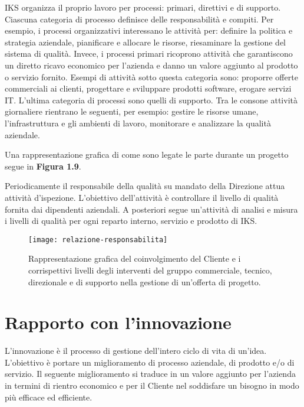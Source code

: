 IKS organizza il proprio lavoro per processi: primari, direttivi e di supporto. 
Ciascuna categoria di processo definisce delle responsabilità e compiti. 
Per esempio, i processi organizzativi interessano le attività per: definire la politica 
e strategia aziendale, pianificare e allocare le risorse, riesaminare la gestione del 
sistema di qualità. Invece, i processi primari ricoprono attività che garantiscono 
un diretto ricavo economico per l'azienda e danno un valore aggiunto al prodotto o 
servizio fornito. Esempi di attività sotto questa categoria sono: proporre offerte 
commerciali ai clienti, progettare e sviluppare prodotti software, erogare servizi IT. 
L'ultima categoria di processi sono quelli di supporto. Tra le consone attività giornaliere 
rientrano le seguenti, per esempio: gestire le risorse umane, l'infrastruttura 
e gli ambienti di lavoro, monitorare e analizzare la qualità aziendale. 

Una rappresentazione grafica di come sono legate le parte durante un progetto 
segue in \textbf{Figura 1.9}.

Periodicamente il responsabile della qualità su mandato della Direzione attua 
attività d'ispezione. L'obiettivo dell'attività è controllare il livello di qualità
fornita dai dipendenti aziendali. A posteriori segue un'attività di 
analisi e misura i livelli di qualità per ogni reparto interno, servizio e 
prodotto di IKS.

\begin{figure}[htbp]
	\begin{center}
		\texttt{[image: relazione-responsabilita]}
		\caption{Rappresentazione grafica del coinvolgimento del 
		Cliente e i corrispettivi livelli degli interventi del gruppo 
		commerciale, tecnico, direzionale e di supporto nella gestione 
		di un'offerta di progetto.}
	\end{center}
\end{figure}



\section{Rapporto con l'innovazione}
L'innovazione è il processo di gestione dell'intero ciclo di vita di un'idea. 
L'obiettivo è portare un miglioramento di processo aziendale, di prodotto e/o 
di servizio. Il seguente miglioramento si traduce in un valore aggiunto per 
l'azienda in termini di rientro economico e per il Cliente nel soddisfare un 
bisogno in modo più efficace ed efficiente. 

